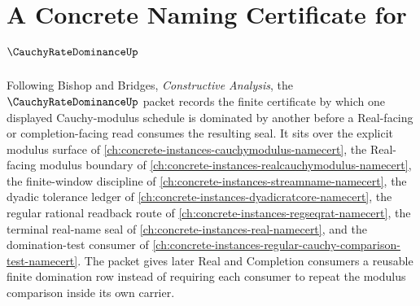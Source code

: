\chapter{A Concrete Naming Certificate for $\CauchyRateDominanceUp$}
\label{ch:concrete-instances-cauchy-rate-dominance-namecert}

Following Bishop and Bridges, \emph{Constructive Analysis}, the $\CauchyRateDominanceUp$ packet records the finite certificate by which one displayed Cauchy-modulus schedule is dominated by another before a Real-facing or completion-facing read consumes the resulting seal. It sits over the explicit modulus surface of \autoref{ch:concrete-instances-cauchymodulus-namecert}, the Real-facing modulus boundary of \autoref{ch:concrete-instances-realcauchymodulus-namecert}, the finite-window discipline of \autoref{ch:concrete-instances-streamname-namecert}, the dyadic tolerance ledger of \autoref{ch:concrete-instances-dyadicratcore-namecert}, the regular rational readback route of \autoref{ch:concrete-instances-regseqrat-namecert}, the terminal real-name seal of \autoref{ch:concrete-instances-real-namecert}, and the domination-test consumer of \autoref{ch:concrete-instances-regular-cauchy-comparison-test-namecert}. The packet gives later Real and Completion consumers a reusable finite domination row instead of requiring each consumer to repeat the modulus comparison inside its own carrier.


